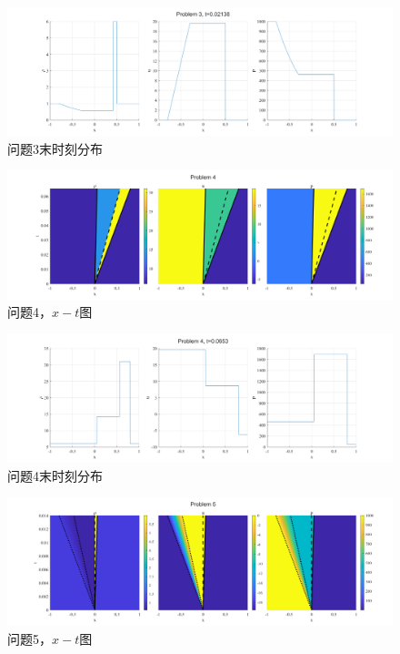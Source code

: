 \documentclass[UTF8,zihao=5]{ctexart} %
\begin{document}
\begin{figure}[H]
    \centering
    \includegraphics[width=18cm]{p3_l.png}  %
    \caption{问题3末时刻分布}
    \label{fig:3b}
\end{figure}

\begin{figure}[H]
    \centering
    \includegraphics[width=18cm]{p4.png}  %
    \caption{问题4，$x-t$图}
    \label{fig:4a}
\end{figure}

\begin{figure}[H]
    \centering
    \includegraphics[width=18cm]{p4_l.png}  %
    \caption{问题4末时刻分布}
    \label{fig:4b}
\end{figure}

\begin{figure}[H]
    \centering
    \includegraphics[width=18cm]{p5.png}  %
    \caption{问题5，$x-t$图}
    \label{fig:5a}
\end{figure}
\end{document}
